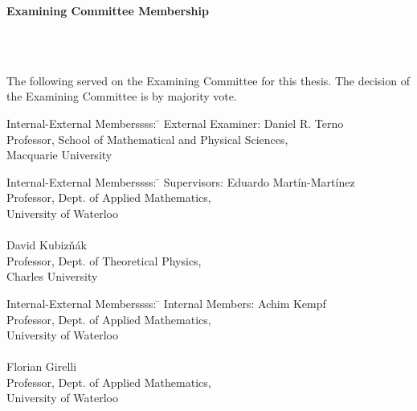 \documentclass[letterpaper,12pt,titlepage,oneside,final]{book}
\let\origdoublepage\cleardoublepage
\newcommand{\clearemptydoublepage}{%
  \clearpage{\pagestyle{empty}\origdoublepage}}
\let\cleardoublepage\clearemptydoublepage
\begin{document}
\cleardoublepage %

\begin{center}\textbf{Examining Committee Membership}\end{center}
  \noindent

\vspace{-3cm}
\textcolor{white}{I wrote this PhD thesis in 6 weeks. I deeply regret starting so late, but I ended up being fairly proud of it :)}
\vspace{2cm}

The following served on the Examining Committee for this thesis. The decision of the Examining Committee is by majority vote.
  \bigskip
  
  \noindent
\begin{tabbing}
Internal-External Memberssss: \=  \kill %
External Examiner: \>  Daniel R. Terno \\ 
\> Professor, School of Mathematical and Physical Sciences,\\ \> Macquarie University \\
\end{tabbing} 
  \bigskip
  \noindent
\begin{tabbing}
Internal-External Memberssss:  \=  \kill %
Supervisors: \>Eduardo Martín-Martínez \\
\> Professor, Dept. of Applied Mathematics,\\ \>University of Waterloo \\
\\
\> David Kubiz\v nák \\
\> Professor, Dept. of Theoretical Physics,\\ \>Charles University \\
\end{tabbing}
  \bigskip
  
  \noindent
  \begin{tabbing}
Internal-External Memberssss: \=  \kill %
Internal Members: \> Achim Kempf \\
\> Professor, Dept. of Applied Mathematics,\\ \>University of Waterloo \\
\\
\> Florian Girelli \\
\> Professor, Dept. of Applied Mathematics,\\ \>University of Waterloo \\
\end{tabbing}
  \bigskip
  \bigskip
  
\end{document}
